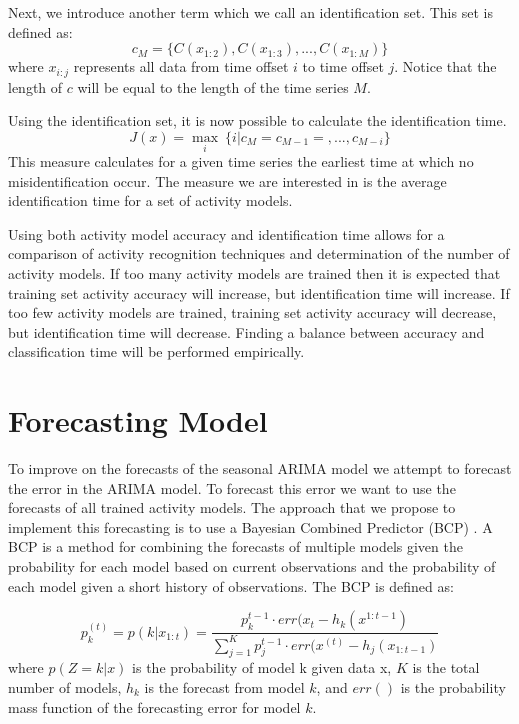 Next, we introduce another term which we call an identification set.  This set is defined as:
\begin{equation}
\label{eq:identification_set}
c_M = \{C(x_{1:2}), C(x_{1:3}), ..., C(x_{1:M})\}
\end{equation}
\noindent
where $x_{i:j}$ represents all data from time offset $i$ to time offset $j$.  Notice that the length of $c$ will be equal to the length of the time series $M$.

Using the identification set, it is now possible to calculate the identification time.  
\begin{equation}
\label{eq:identification_time}
J(x) = \max_{i}\ \{i|c_{M}=c_{M-1}=,...,c_{M-i}\}
\end{equation}
\noindent
This measure calculates for a given time series the earliest time at which no misidentification occur.  The measure we are interested in is the average identification time for a set of activity models.

Using both activity model accuracy and identification time allows for a comparison of activity recognition techniques and determination of the number of activity models.  If too many activity models are trained then it is expected that training set activity accuracy will increase, but identification time will increase.  If too few activity models are trained, training set activity accuracy will decrease, but identification time will decrease.  Finding a balance between accuracy and classification time will be performed empirically. 

\section{Forecasting Model}
To improve on the forecasts of the seasonal ARIMA model we attempt to forecast the error in the ARIMA model.   To forecast this error we want to use the forecasts of all trained activity models.  The approach that we propose to implement this forecasting is to use a Bayesian Combined Predictor (BCP) \cite{Petridis2001}.  A BCP is a method for combining the forecasts of multiple models given the probability for each model based on current observations and the probability of each model given a short history of observations.  The BCP is defined as:

\begin{equation}
\label{eq:model_prob}
p_{k}^{(t)} = p(k|x_{1:t}) = \frac{p_{k}^{t - 1} \cdot err(x_{t} - h_{k}(x^{1:t-1})}{\sum_{j=1}^{K}p_{j}^{t - 1} \cdot err(x^{(t)} - h_{j}(x_{1:t-1})}
\end{equation}
\noindent
where $p(Z=k|x)$ is the probability of model k given data x, $K$ is the total number of models, $h_{k}$ is the forecast from model $k$, and $err()$ is the probability mass function of the forecasting error for model $k$.  

